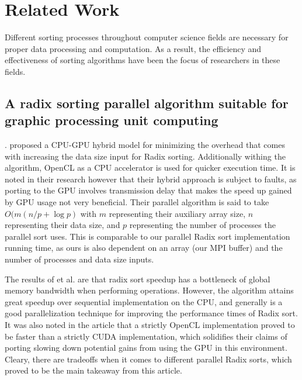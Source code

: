 \documentclass[11pt,twocolumn]{article}
\begin{document}
\section {Related Work}\label{relwork}

Different sorting processes throughout computer science fields are necessary for proper data processing and computation. As a result, the efficiency and effectiveness of sorting algorithms have been the focus of researchers in these fields. 

\subsection{A radix sorting parallel algorithm suitable for graphic processing unit computing}
\cite{Xiao}. proposed a CPU-GPU hybrid model for minimizing the overhead that comes with increasing the data size input for Radix sorting. Additionally withing the algorithm, OpenCL as a CPU accelerator is used for quicker execution time. It is noted in their research however that their hybrid approach is subject to faults, as porting to the GPU involves transmission delay that makes the speed up gained by GPU usage not very beneficial. Their parallel algorithm is said to take $O(m({n/p}+\log{p})$ with $m$ representing their auxiliary array size, $n$ representing their data size, and $p$ representing the number of processes the parallel sort uses. This is comparable to our parallel Radix sort implementation running time, as ours is also dependent on an array (our MPI buffer) and the number of processes and data size inputs.

The results of \cite{Xiao} et al. are that radix sort speedup has a bottleneck of global memory bandwidth when performing operations. However, the algorithm attains great speedup over sequential implementation on the CPU, and generally is a good parallelization technique for improving the performance times of Radix sort. It was also noted in the article that a strictly OpenCL implementation proved to be faster than a strictly CUDA implementation, which solidifies their claims of porting slowing down potential gains from using the GPU in this environment. Cleary, there are tradeoffs when it comes to different parallel Radix sorts, which proved to be the main takeaway from this article. 
\end{document}
